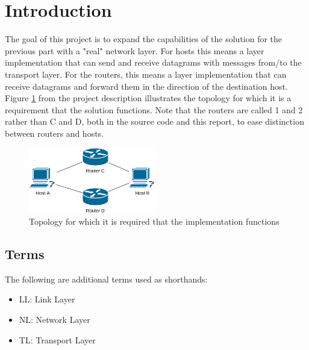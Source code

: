 \section{Introduction}

The goal of this project is to expand the capabilities of the solution for the previous part with a "real" network layer. For hosts this means a layer implementation that can send and receive datagrams with messages from/to the transport layer. For the routers, this means a layer implementation that can receive datagrams and forward them in the direction of the destination host.\\
Figure \ref{fig:GivenTopology} from the project description illustrates the topology for which it is a requirement that the solution functions. Note that the routers are called 1 and 2 rather than C and D, both in the source code and this report, to ease distinction between routers and hosts.

\begin{figure}[H]
\centering
\includegraphics[width=0.5\textwidth]{../figs/network-topology.png}
\caption{Topology for which it is required that the implementation functions}
\label{fig:GivenTopology}
\end{figure}



\subsection{Terms}
The following are additional terms used as shorthands:
\begin{itemize}
\item LL: Link Layer
\item NL: Network Layer
\item TL: Transport Layer
\end{itemize}



